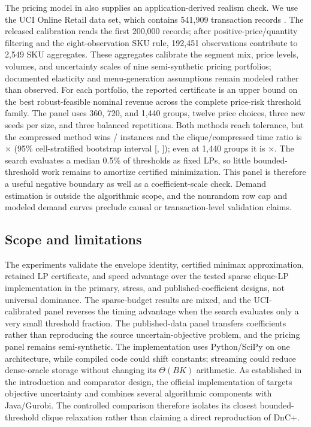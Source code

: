 \documentclass[11pt]{article}
\theoremstyle{plain}
\theoremstyle{definition}
\theoremstyle{remark}
\begin{document}
The pricing model in  also supplies an application-derived realism check.  We use the UCI Online Retail data set, which contains 541,909 transaction records \citep{Chen2015UCI}.  The released calibration reads the first 200,000 records; after positive-price/quantity filtering and the eight-observation SKU rule, 192,451 observations contribute to 2,549 SKU aggregates.  These aggregates calibrate the segment mix, price levels, volumes, and uncertainty scales of nine semi-synthetic pricing portfolios; documented elasticity and menu-generation assumptions remain modeled rather than observed.  For each portfolio, the reported certificate is an upper bound on the best robust-feasible nominal revenue across the complete price-risk threshold family.  The panel uses 360, 720, and 1,440 groups, twelve price choices, three new seeds per size, and three balanced repetitions.  Both methods reach tolerance, but the compressed method wins \PubApplicationWins{}/\PubApplicationCases{} instances and the clique/compressed time ratio is \PubApplicationGeoSpeedup$\times$ (95\% cell-stratified bootstrap interval [\PubApplicationCILow, \PubApplicationCIHigh]); even at 1,440 groups it is \PubApplicationNHighSpeedup$\times$.  The search evaluates a median 0.5\% of thresholds as fixed LPs, so little bounded-threshold work remains to amortize certified minimization.  This panel is therefore a useful negative boundary as well as a coefficient-scale check.  Demand estimation is outside the algorithmic scope, and the nonrandom row cap and modeled demand curves preclude causal or transaction-level validation claims.

\subsection{Scope and limitations}

The experiments validate the envelope identity, certified minimax approximation, retained LP certificate, and speed advantage over the tested sparse clique-LP implementation in the primary, stress, and published-coefficient designs, not universal dominance.  The sparse-budget results are mixed, and the UCI-calibrated panel reverses the timing advantage when the search evaluates only a very small threshold fraction.  The published-data panel transfers coefficients rather than reproducing the source uncertain-objective problem, and the pricing panel remains semi-synthetic.  The implementation uses Python/SciPy on one architecture, while compiled code could shift constants; streaming could reduce dense-oracle storage without changing its $\Theta(BK)$ arithmetic.  As established in the introduction and comparator design, the official implementation of \citet{BusingGersingKoster2023} targets objective uncertainty and combines several algorithmic components with Java/Gurobi.  The controlled comparison therefore isolates its closest bounded-threshold clique relaxation rather than claiming a direct reproduction of DnC+.
\end{document}
